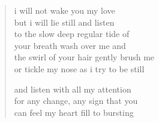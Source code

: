 
\begin{verse}
i will not wake you my love \\
but i will lie still and listen \\
to the slow deep regular tide of \\
your breath wash over me and \\
the swirl of your hair gently brush me \\
or tickle my nose as i try to be still

and listen with all my attention \\
for any change, any sign that you \\
can feel my heart fill to bursting
\end{verse}
